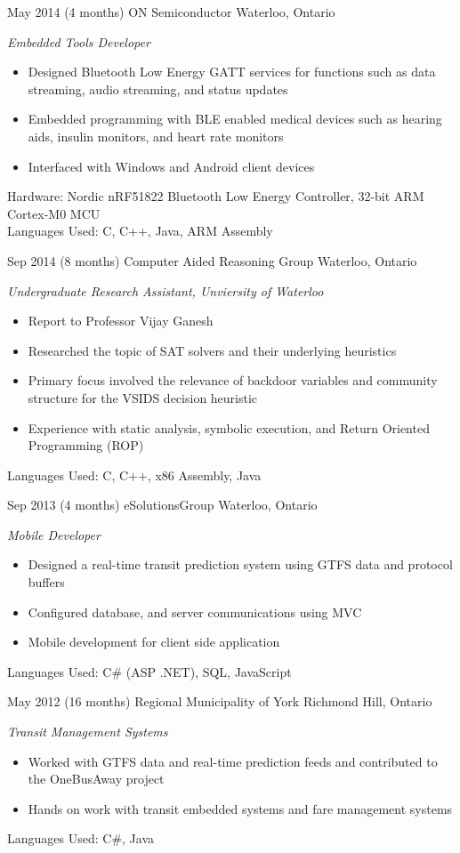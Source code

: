 \documentclass[print]{friggeri-cv} %
\begin{document}
\begin{entrylist}

\entry
{May 2014}
{(4 months)}
{ON Semiconductor}
{Waterloo, Ontario}
{\emph{Embedded Tools Developer}
\begin{itemize}
\item Designed Bluetooth Low Energy GATT services for functions such as data streaming, audio streaming, and status updates
\item Embedded programming with BLE enabled medical devices such as hearing aids, insulin monitors, and heart rate monitors
\item Interfaced with Windows and Android client devices
\end{itemize}
Hardware: Nordic nRF51822 Bluetooth Low Energy Controller, 32-bit ARM Cortex-M0 MCU \\
Languages Used: C, C++, Java, ARM Assembly \\
}

\entry
{Sep 2014}
{(8 months)}
{Computer Aided Reasoning Group}
{Waterloo, Ontario}
{\emph{Undergraduate Research Assistant, Unviersity of Waterloo}
\begin{itemize}
\item Report to Professor Vijay Ganesh 
\item Researched the topic of SAT solvers and their underlying heuristics
\item Primary focus involved the relevance of backdoor variables and community structure for the VSIDS decision heuristic
\item Experience with static analysis, symbolic execution, and Return Oriented Programming (ROP) 
\end{itemize}
Languages Used: C, C++, x86 Assembly, Java \\
}

\entry
{Sep 2013}
{(4 months)}
{eSolutionsGroup}
{Waterloo, Ontario}
{\emph{Mobile Developer}
\begin{itemize}
\item Designed a real-time transit prediction system using GTFS data and protocol buffers
\item Configured database, and server communications using MVC
\item Mobile development for client side application 
\end{itemize}
Languages Used: C\# (ASP .NET), SQL, JavaScript \\
}

\entry
{May 2012}
{(16 months)}
{Regional Municipality of York}
{Richmond Hill, Ontario}
{\emph{Transit Management Systems}
\begin{itemize}
\item Worked with GTFS data and real-time prediction feeds and contributed to the OneBusAway project
\item Hands on work with transit embedded systems and fare management systems
\end{itemize}
Languages Used: C\#, Java \\
}

\end{entrylist}
\end{document}
